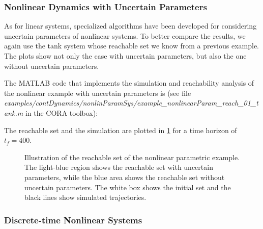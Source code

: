 \subsubsection{Nonlinear Dynamics with Uncertain Parameters}

As for linear systems, specialized algorithms have been developed for considering uncertain parameters of nonlinear systems. To better compare the results, we again use the tank system whose reachable set we know from a previous example. The plots show not only the case with uncertain parameters, but also the one without uncertain parameters.

The MATLAB code that implements the simulation and reachability analysis of the nonlinear example with uncertain parameters is (see file \textit{examples/contDynamics/nonlinParamSys/}\textit{example\_nonlinearParam\_reach\_01\_tank.m} in the CORA toolbox):
    {\small
}

The reachable set and the simulation are plotted in \cref{fig:example_nonlinearParam_reach_01_tank} for a time horizon of $t_f = 400$.
\begin{figure}[htb]
    \centering
    \footnotesize
    \caption{Illustration of the reachable set of the nonlinear parametric example. The light-blue region shows the reachable set with uncertain parameters, while the blue area shows the reachable set without uncertain parameters. The white box shows the initial set and the black lines show simulated trajectories.}
    \label{fig:example_nonlinearParam_reach_01_tank}
\end{figure}

\subsubsection{Discrete-time Nonlinear Systems}

